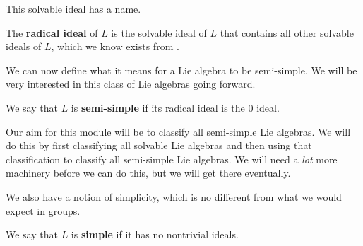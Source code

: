 This solvable ideal has a name.

\begin{boxdefinition}
    The \textbf{radical ideal} of $L$ is the solvable ideal of $L$ that contains all other solvable ideals of $L$, which we know exists from .
\end{boxdefinition}

We can now define what it means for a Lie algebra to be semi-simple. We will be very interested in this class of Lie algebras going forward.

\begin{boxdefinition}\label{Ch1:Def:SemiSimple}
    We say that $L$ is \textbf{semi-simple} if its radical ideal is the $0$ ideal.
\end{boxdefinition}

Our aim for this module will be to classify all semi-simple Lie algebras. We will do this by first classifying all solvable Lie algebras and then using that classification to classify all semi-simple Lie algebras. We will need a \textit{lot} more machinery before we can do this, but we will get there eventually.

We also have a notion of simplicity, which is no different from what we would expect in groups.

\begin{boxdefinition}[Simplicity]
    We say that $L$ is \textbf{simple} if it has no nontrivial ideals.
\end{boxdefinition}
